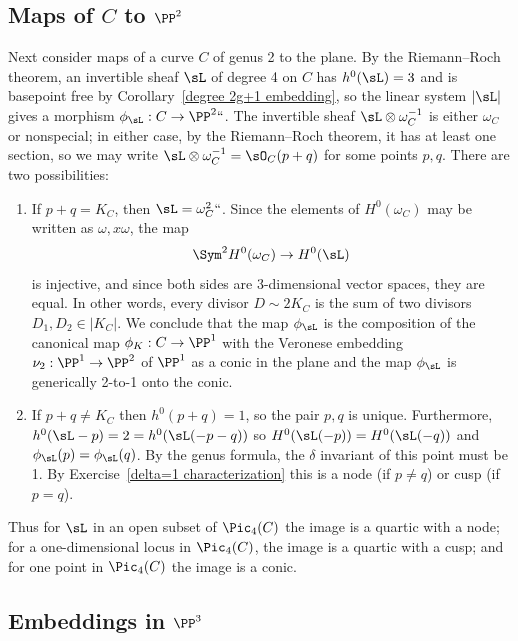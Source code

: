 \subsection*{Maps of $C$ to $\PP^2$}
Next consider maps of a curve $C$ of genus 2 to the plane. By the Riemann--Roch
%
theorem, an invertible sheaf $\sL$ of degree 4 on $C$
has
$h^0(\sL)
= 3$ and is basepoint free by Corollary~\ref{degree 2g+1 embedding}, so
the linear system $|\sL|$  gives a morphism $\phi_\sL : C \to \PP^2` `$. The
invertible sheaf $\sL\otimes \omega_C^{-1}$ is either
$\omega_C$ or nonspecial; in either case, by the Riemann--Roch theorem,
it has at least one section,
so we may write $\sL\otimes \omega_C^{-1} = \sO_C(p+q)$ for some points
$p,q$. There are two possibilities:

\begin{enumerate}
\item If $p+q =  K_C$, then $\sL = \omega_C^2` `$. Since
the elements of $H^0(\omega_C)$ may be written as $\omega, x\omega$,
the map
$$
\Sym^2 H^0(\omega_C) \to H^0(\sL)
$$
 is injective, and since both sides are 3-dimensional vector spaces,
 they are equal. In other words, every divisor $D \sim 2K_C$ is the sum
 of two divisors $D_1, D_2 \in |K_C|$. We conclude that the map $\phi_\sL$
 is the composition of the canonical map $\phi_K : C \to \PP^1$ with the
Veronese embedding
%
 $\nu_2 : \PP^1 \to \PP^2$ of $\PP^1$ as a conic in
 the plane and the map $\phi_\sL$ is generically 2-to-1 onto the conic.

\item
\label{p+q not g12}
If $p+q \neq  K_C$  then $h^0(p+q) = 1$, so the pair $p,q$ is
unique. Furthermore,
 $h^0(\sL-p) = 2 =  h^0(\sL(-p-q))$ so
 $H^0(\sL(-p)) = H^0(\sL(-q))$ and $\phi_\sL(p) = \phi_\sL(q)$.
By the genus formula, the
$\delta$ invariant
%
of this point must be 1. By
Exercise~\ref{delta=1 characterization}
 this is a
node
%
(if $p\neq q$) or
cusp
%
%
(if $p=q$).
\end{enumerate}

Thus  for $\sL$ in an open subset of $\Pic_4(C)$ the image is a quartic
with a node; for a one-dimensional locus in $\Pic_4(C)$, the image is
a quartic with a cusp; and for one point in $\Pic_4(C)$ the image is
a conic.

\subsection*{Embeddings in $\PP^3$}

